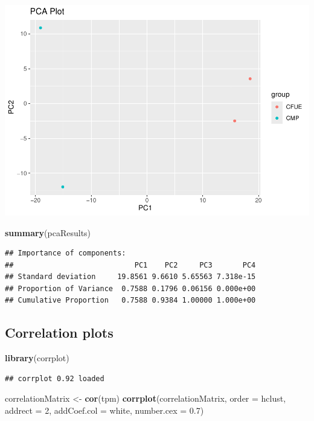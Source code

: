 \documentclass[
]{article}
\newenvironment{Shaded}{\begin{snugshade}}{\end{snugshade}}
\newcommand{\AttributeTok}[1]{\textcolor[rgb]{0.13,0.29,0.53}{#1}}
\newcommand{\DecValTok}[1]{\textcolor[rgb]{0.00,0.00,0.81}{#1}}
\newcommand{\FloatTok}[1]{\textcolor[rgb]{0.00,0.00,0.81}{#1}}
\newcommand{\FunctionTok}[1]{\textcolor[rgb]{0.13,0.29,0.53}{\textbf{#1}}}
\newcommand{\NormalTok}[1]{#1}
\newcommand{\OtherTok}[1]{\textcolor[rgb]{0.56,0.35,0.01}{#1}}
\newcommand{\StringTok}[1]{\textcolor[rgb]{0.31,0.60,0.02}{#1}}
\begin{document}
\includegraphics{RNA_Analysis_23_files/figure-latex/PCA-1.pdf}

\begin{Shaded}
\begin{Highlighting}[]
\FunctionTok{summary}\NormalTok{(pcaResults)}
\end{Highlighting}
\end{Shaded}

\begin{verbatim}
## Importance of components:
##                            PC1    PC2     PC3       PC4
## Standard deviation     19.8561 9.6610 5.65563 7.318e-15
## Proportion of Variance  0.7588 0.1796 0.06156 0.000e+00
## Cumulative Proportion   0.7588 0.9384 1.00000 1.000e+00
\end{verbatim}

\hypertarget{correlation-plots}{%
\subsection{Correlation plots}\label{correlation-plots}}

\begin{Shaded}
\begin{Highlighting}[]
\FunctionTok{library}\NormalTok{(corrplot)}
\end{Highlighting}
\end{Shaded}

\begin{verbatim}
## corrplot 0.92 loaded
\end{verbatim}

\begin{Shaded}
\begin{Highlighting}[]
\NormalTok{correlationMatrix }\OtherTok{\textless{}{-}} \FunctionTok{cor}\NormalTok{(tpm)}
\FunctionTok{corrplot}\NormalTok{(correlationMatrix, }\AttributeTok{order =} \StringTok{\textquotesingle{}hclust\textquotesingle{}}\NormalTok{, }
         \AttributeTok{addrect =} \DecValTok{2}\NormalTok{, }\AttributeTok{addCoef.col =} \StringTok{\textquotesingle{}white\textquotesingle{}}\NormalTok{, }
         \AttributeTok{number.cex =} \FloatTok{0.7}\NormalTok{) }
\end{Highlighting}
\end{Shaded}
\end{document}
